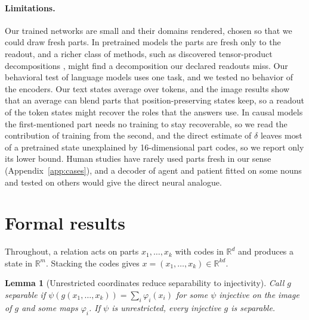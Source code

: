 \documentclass[10pt]{article}
\theoremstyle{plain}
\newtheorem{lemma}{Lemma}
\theoremstyle{remark}
\newcommand{\R}{\mathbb{R}}
\begin{document}
\paragraph{Limitations.} Our trained networks are small and their domains rendered, chosen so that we could draw fresh parts. In pretrained models the parts are fresh only to the readout, and a richer class of methods, such as discovered tensor-product decompositions \citep{soulos2020}, might find a decomposition our declared readouts miss. Our behavioral test of language models uses one task, and we tested no behavior of the encoders. Our text states average over tokens, and the image results show that an average can blend parts that position-preserving states keep, so a readout of the token states might recover the roles that the answers use. In causal models the first-mentioned part needs no training to stay recoverable, so we read the contribution of training from the second, and the direct estimate of $\delta$ leaves most of a pretrained state unexplained by 16-dimensional part codes, so we report only its lower bound. Human studies have rarely used parts fresh in our sense (Appendix~\ref{app:cases}), and a decoder of agent and patient \citep{frankland2015} fitted on some nouns and tested on others would give the direct neural analogue.

\FloatBarrier



\clearpage
\appendix
{}

\section{Formal results}
\label{app:proofs}

Throughout, a relation acts on parts $x_1, \ldots, x_k$ with codes in $\R^d$ and produces a state in $\R^m$. Stacking the codes gives $x = (x_1, \ldots, x_k) \in \R^{kd}$.



\begin{lemma}[Unrestricted coordinates reduce separability to injectivity]
\label{lem:psi}
Call $g$ separable if $\psi(g(x_1, \ldots, x_k)) = \sum_i \varphi_i(x_i)$ for some $\psi$ injective on the image of $g$ and some maps $\varphi_i$. If $\psi$ is unrestricted, every injective $g$ is separable.
\end{lemma}
\end{document}
